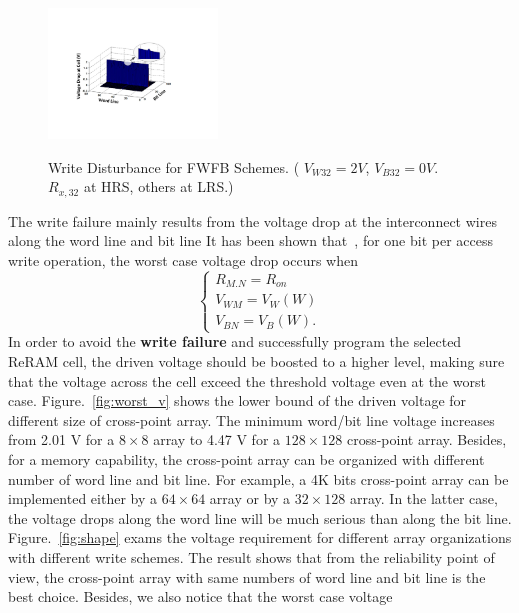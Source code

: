 \begin{figure}%
\centering
  \includegraphics[width=0.4\textwidth]{./figures/FWFB4.pdf}\\
  \caption{Write Disturbance for FWFB Schemes. ( $V_{W32} = 2V$, $V_{B32} = 0V$. $R_{x,32}$ at HRS, others at LRS.) }\label{fig:FWFR}
\end{figure}

The write failure mainly results from the voltage drop at the interconnect wires along the word line and bit line It has been shown that~\cite{crossbar_TED_2010}, for one bit per access write operation, the worst case voltage drop occurs when
\begin{equation}
\left\{
\begin{array}{l}
R_{M.N}=R_{on}\\
V_{WM}=V_W(W)\\
V_{BN}=V_B(W).
\end{array} \right.
\end{equation}
In order to avoid the \textbf{write failure} and successfully program the
selected ReRAM cell, the driven voltage should be boosted to a higher
level, making sure that the voltage across the cell exceed the threshold
voltage even at the worst case. Figure.~\ref{fig:worst_v} shows the lower bound of the driven voltage for different size of cross-point array. The minimum word/bit line voltage increases from 2.01 V for a $8 \times 8$ array to 4.47 V for a $128 \times 128$ cross-point array. Besides, for a  memory capability, the cross-point array can be organized with different number of word line and bit line. For example, a 4K bits cross-point array can be implemented either by a $64 \times 64$ array or by a $32 \times 128$ array. In the latter case, the voltage drops along the word line will be much serious than along the bit line. Figure.~\ref{fig:shape}
exams the voltage requirement for different array organizations with different write schemes. The result shows that from the reliability point of view, the cross-point array with same numbers of word line and bit line is the best choice. Besides, we also notice that the worst case voltage

